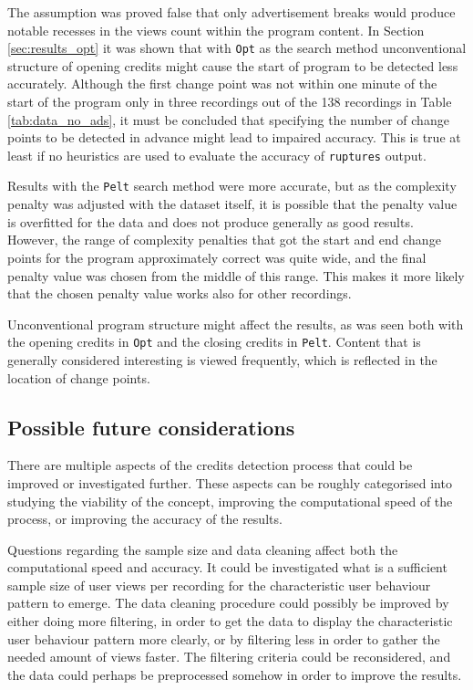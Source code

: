 The assumption was proved false that only advertisement breaks would produce notable recesses in the views count within the program content. 
In Section \ref{sec:results_opt} it was shown that with \texttt{Opt} as the search method unconventional structure of opening credits might cause the start of program to be detected less accurately. Although the first change point was not within one minute of the start of the program only in three recordings out of the 138 recordings in Table \ref{tab:data_no_ads}, it must be concluded that specifying the number of change points to be detected in advance might lead to impaired accuracy. This is true at least if no heuristics are used to evaluate the accuracy of \texttt{ruptures} output.

Results with the \texttt{Pelt} search method were more accurate, but as the complexity penalty was adjusted with the dataset itself, it is possible that the penalty value is overfitted for the data and does not produce generally as good results. However, the range of complexity penalties that got the start and end change points for the program approximately correct was quite wide, and the final penalty value was chosen from the middle of this range. This makes it more likely that the chosen penalty value works also for other recordings.

Unconventional program structure might affect the results, as was seen both with the opening credits in \texttt{Opt} and the closing credits in \texttt{Pelt}. Content that is generally considered interesting is viewed frequently, which is reflected in the location of change points.

\subsection{Possible future considerations}

There are multiple aspects of the credits detection process that could be improved or investigated further. These aspects can be roughly categorised into studying the viability of the concept, improving the computational speed of the process, or improving the accuracy of the results.

Questions regarding the sample size and data cleaning affect both the computational speed and accuracy. It could be investigated what is a sufficient sample size of user views per recording for the characteristic user behaviour pattern to emerge. The data cleaning procedure could possibly be improved by either doing more filtering, in order to get the data to display the characteristic user behaviour pattern more clearly, 
or by filtering less in order to gather the needed amount of views faster. The filtering criteria could be reconsidered, and the data could perhaps be preprocessed  somehow in order to improve the results.

